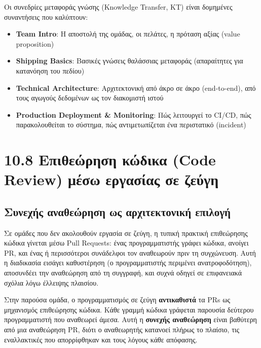 \documentclass[11pt,a4paper,greek,twoside]{template-xe}
\providecommand{\tightlist}{\setlength{\itemsep}{0pt}\setlength{\parskip}{0pt}}
\begin{document}
Οι συνεδρίες μεταφοράς γνώσης (Knowledge Transfer, KT) είναι δομημένες
συναντήσεις που καλύπτουν:

\begin{itemize}
\tightlist
\item
  \textbf{Team Intro}: Η αποστολή της ομάδας, οι πελάτες, η πρόταση
  αξίας (value proposition)
\item
  \textbf{Shipping Basics}: Βασικές γνώσεις θαλάσσιας μεταφοράς
  (απαραίτητες για κατανόηση του πεδίου)
\item
  \textbf{Technical Architecture}: Αρχιτεκτονική από άκρο σε άκρο
  (end-to-end), από τους αγωγούς δεδομένων ως τον διακομιστή ιστού
\item
  \textbf{Production Deployment \& Monitoring}: Πώς λειτουργεί το CI/CD,
  πώς παρακολουθείται το σύστημα, πώς αντιμετωπίζεται ένα περιστατικό
  (incident)
\end{itemize}

\section{10.8 Επιθεώρηση κώδικα (Code Review) μέσω εργασίας σε
ζεύγη}\label{ux3b5ux3c0ux3b9ux3b8ux3b5ux3ceux3c1ux3b7ux3c3ux3b7-ux3baux3ceux3b4ux3b9ux3baux3b1-code-review-ux3bcux3adux3c3ux3c9-ux3b5ux3c1ux3b3ux3b1ux3c3ux3afux3b1ux3c2-ux3c3ux3b5-ux3b6ux3b5ux3cdux3b3ux3b7}

\subsection{Συνεχής αναθεώρηση ως αρχιτεκτονική
επιλογή}\label{ux3c3ux3c5ux3bdux3b5ux3c7ux3aeux3c2-ux3b1ux3bdux3b1ux3b8ux3b5ux3ceux3c1ux3b7ux3c3ux3b7-ux3c9ux3c2-ux3b1ux3c1ux3c7ux3b9ux3c4ux3b5ux3baux3c4ux3bfux3bdux3b9ux3baux3ae-ux3b5ux3c0ux3b9ux3bbux3bfux3b3ux3ae}

Σε ομάδες που δεν ακολουθούν εργασία σε ζεύγη, η τυπική πρακτική
επιθεώρησης κώδικα γίνεται μέσω Pull Requests: ένας προγραμματιστής
γράφει κώδικα, ανοίγει PR, και ένας ή περισσότεροι συνάδελφοι τον
αναθεωρούν πριν τη συγχώνευση. Αυτή η διαδικασία εισάγει καθυστέρηση (ο
προγραμματιστής περιμένει ανατροφοδότηση), αποσυνδέει την αναθεώρηση από
τη συγγραφή, και συχνά οδηγεί σε επιφανειακά σχόλια λόγω έλλειψης
πλαισίου.

Στην παρούσα ομάδα, ο προγραμματισμός σε ζεύγη \textbf{αντικαθιστά} τα
PRs ως μηχανισμός επιθεώρησης κώδικα. Κάθε γραμμή κώδικα γράφεται
παρουσία δεύτερου προγραμματιστή που αναθεωρεί άμεσα. Αυτή η
\textbf{συνεχής αναθεώρηση} είναι βαθύτερη από μια αναθεώρηση PR, διότι
ο αναθεωρητής κατανοεί πλήρως το πλαίσιο, τις εναλλακτικές που
απορρίφθηκαν και τους λόγους κάθε απόφασης.
\end{document}
